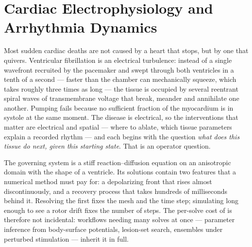 
\chapter{Cardiac Electrophysiology and Arrhythmia Dynamics}
\label{ch:part3-cardiac-electrophysiology-and-arrhythmia-d}
\label{sec:cardiac}

Most sudden cardiac deaths are not caused by a heart that stops, but by one that
quivers. Ventricular fibrillation is an electrical
turbulence: instead of a single wavefront recruited by the pacemaker and swept
through both ventricles in a tenth of a second --- faster than the chamber can
mechanically squeeze, which takes roughly three times as long --- the
tissue is occupied by several reentrant spiral waves of transmembrane voltage
that break, meander and annihilate one another. Pumping fails because no
sufficient fraction of the myocardium is in systole at the same moment. The
disease is electrical, so the interventions that matter are electrical and
spatial --- where to ablate, which tissue parameters explain a recorded
rhythm --- and each begins with the question \emph{what does this tissue do next,
given this starting state}. That is an operator question.

The governing system is a stiff
reaction--diffusion equation on an anisotropic domain with the shape of a
ventricle. Its solutions contain two features that a numerical method must pay
for: a depolarizing front that rises almost discontinuously, and a recovery
process that takes hundreds of milliseconds behind
it. Resolving the first fixes the mesh and the time step; simulating long enough
to see a rotor drift fixes the number of steps. The per-solve cost of
 is therefore not
incidental: workflows needing many solves at once --- parameter inference from
body-surface potentials, lesion-set search, ensembles under perturbed
stimulation --- inherit it in full.

